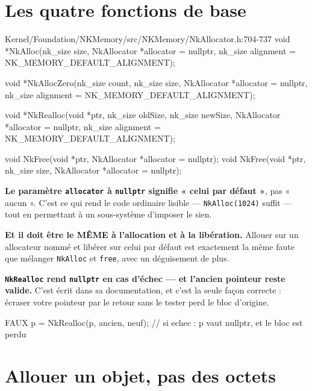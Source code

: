 \section{Les quatre fonctions de base}

\begin{nkcode}{Kernel/Foundation/NKMemory/src/NKMemory/NkAllocator.h:704-737}
void *NkAlloc(nk_size size, NkAllocator *allocator = nullptr,
              nk_size alignment = NK_MEMORY_DEFAULT_ALIGNMENT);

void *NkAllocZero(nk_size count, nk_size size, NkAllocator *allocator = nullptr,
                  nk_size alignment = NK_MEMORY_DEFAULT_ALIGNMENT);

void *NkRealloc(void *ptr, nk_size oldSize, nk_size newSize,
                NkAllocator *allocator = nullptr,
                nk_size alignment = NK_MEMORY_DEFAULT_ALIGNMENT);

void NkFree(void *ptr, NkAllocator *allocator = nullptr);
void NkFree(void *ptr, nk_size size, NkAllocator *allocator = nullptr);
\end{nkcode}

\begin{nkretenir}
\textbf{Le paramètre \texttt{allocator} à \texttt{nullptr} signifie « celui par
défaut »}, pas « aucun ». C'est ce qui rend le code ordinaire lisible ---
\texttt{NkAlloc(1024)} suffit --- tout en permettant à un sous-système d'imposer
le sien.

\textbf{Et il doit être le MÊME à l'allocation et à la libération.} Allouer sur
un allocateur nommé et libérer sur celui par défaut est exactement la même faute
que mélanger \texttt{NkAlloc} et \texttt{free}, avec un déguisement de plus.
\end{nkretenir}

\begin{nkretenir}
\textbf{\texttt{NkRealloc} rend \texttt{nullptr} en cas d'échec --- et l'ancien
pointeur reste valide.} C'est écrit dans sa documentation, et c'est la seule
façon correcte : écraser votre pointeur par le retour sans le tester perd le
bloc d'origine.

\begin{nkcode}{FAUX}
p = NkRealloc(p, ancien, neuf);   // si echec : p vaut nullptr, et le bloc est perdu
\end{nkcode}
\end{nkretenir}

\section{Allouer un objet, pas des octets}

